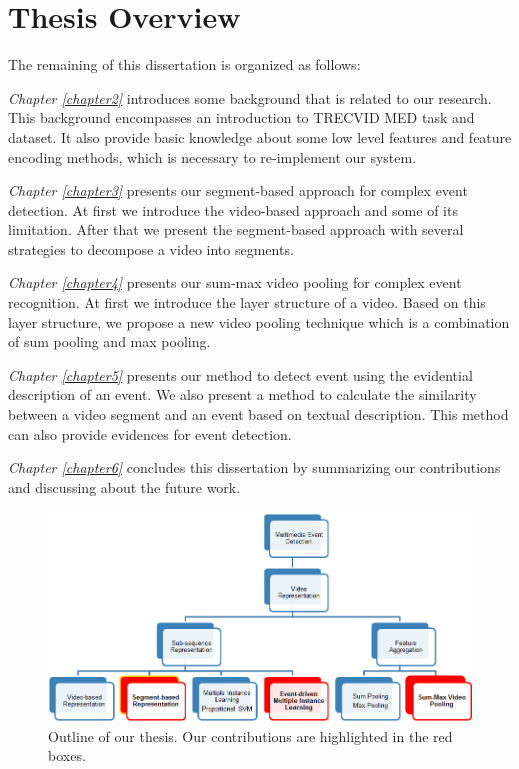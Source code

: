\section{Thesis Overview}


The remaining of this dissertation is organized as follows:

\textit{Chapter \ref{chapter2}} introduces some background that is related to our research. This background encompasses an introduction to TRECVID MED task and dataset. It also provide basic knowledge about some low level features and feature encoding methods, which is necessary to re-implement our system. 

\textit{Chapter \ref{chapter3}} presents our segment-based approach for complex event detection. At first we introduce the video-based approach and some of its limitation. After that we present the segment-based approach with several strategies to decompose a video into segments.

\textit{Chapter \ref{chapter4}} presents our sum-max video pooling for complex event recognition. At first we introduce the layer structure of a video. Based on this layer structure, we propose a new video pooling technique which is a combination of sum pooling and max pooling.

\textit{Chapter \ref{chapter5}} presents our method to detect event using the evidential description of an event. We also present a method to calculate the similarity between a video segment and an event based on textual description. This method can also provide evidences for event detection.

\textit{Chapter \ref{chapter6}} concludes this dissertation by summarizing our contributions and discussing about the future work.

	\begin{figure}
		\centering
		\includegraphics[width=1\textwidth]{outline.png}
		\caption{Outline of our thesis. Our contributions are highlighted in the red boxes.}
		\label{c1_outline}
	\end{figure}
	

